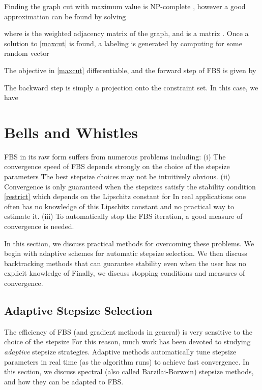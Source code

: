 \documentclass{amsart}
\newcommand{\aln}[1]{}
\newcommand{\splt}[1]{\begin{split}#1\end{split}}
\newcommand{\ra}{\rangle}
\newcommand{\la}{\langle}
\newcommand{\st}{\hbox{ \,\,subject to\,\, }}
\DeclareMathOperator*{\minimize}{minimize\quad}
\theoremstyle{definition}
\begin{document}
Finding the graph cut with maximum value is NP-complete \cite{GW95}, however a good approximation can be found by solving     
        \aln{ \splt{\minimize_X   &  \la W,XX^T\ra\\  \label{maxcut}
   \st & \|X\|_{2,\infty}^2 \le 1
   }}
where  is the weighted adjacency matrix of the graph, and  is a matrix  \cite{LRSST10}. Once a solution to \eqref{maxcut} is found, a labeling is generated by computing  for some random vector   

The objective in \eqref{maxcut} differentiable, and the forward step of FBS is given by 
 
The backward step is simply a projection onto the constraint set.  In this case, we have
  





\section{Bells and Whistles} \label{sec:baw}
FBS in its raw form suffers from numerous problems including: (i) The convergence speed of FBS depends strongly on the choice of the stepsize parameters  The best stepsize choices may not be intuitively obvious.    (ii)  Convergence is only guaranteed when the stepsizes satisfy the stability condition \eqref{restrict} which depends on the Lipschitz constant for   In real applications one often has no knowledge of this Lipschitz constant and no practical way to estimate it.  (iii) To automatically stop the FBS iteration, a good measure of convergence is needed.

  In this section, we discuss practical methods for overcoming these problems.  We begin with adaptive schemes for automatic stepsize selection.  We then discuss backtracking methods that can guarantee stability even when the user has no explicit knowledge of   Finally, we discuss stopping conditions and measures of convergence.

\subsection{Adaptive Stepsize Selection} \label{sec:adapt}
The efficiency of FBS (and gradient methods in general) is very sensitive to the choice of the stepsize   For this reason, much work has been devoted to studying {\em adaptive} stepsize strategies. Adaptive methods automatically tune stepsize parameters in real time (as the algorithm runs) to achieve fast convergence.  In this section, we discuss spectral (also called Barzilai-Borwein) stepsize methods, and how they can be adapted to FBS. 
\end{document}
